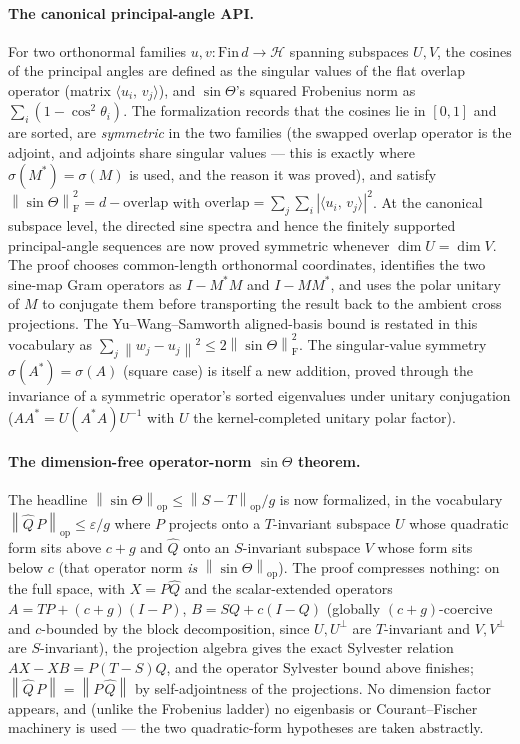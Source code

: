 \documentclass[11pt]{article}
\newcommand{\norm}[1]{\left\lVert #1\right\rVert}
\newcommand{\eps}{\varepsilon}
\newcommand{\F}{\mathrm{F}}
\newcommand{\op}{\mathrm{op}}
\newcommand{\inner}[2]{\langle #1,\,#2\rangle}
\newcommand{\gap}{g}
\newcommand{\HH}{\mathcal H}
\newcommand{\sinT}{\sin\Theta}
\theoremstyle{remark}
\begin{document}
\paragraph{The canonical principal-angle API.}
For two orthonormal families $u,v:\mathrm{Fin}\,d\to\HH$ spanning subspaces
$U,V$, the cosines of the principal angles are defined as the singular values
of the flat overlap operator (matrix $\inner{u_i}{v_j}$), and $\sin\Theta$'s
squared Frobenius norm as $\sum_i(1-\cos^2\theta_i)$.  The formalization records
that the cosines lie in $[0,1]$ and are sorted, are \emph{symmetric} in the two
families (the swapped overlap operator is the adjoint, and adjoints share
singular values --- this is exactly where $\sigma(M^{*})=\sigma(M)$ is used, and
the reason it was proved), and satisfy $\norm{\sinT}_{\F}^2=d-\mathrm{overlap}$
with $\mathrm{overlap}=\sum_j\sum_i|\inner{u_i}{v_j}|^2$.  At the canonical
subspace level, the directed sine spectra and hence the finitely supported
principal-angle sequences are now proved symmetric whenever
$\dim U=\dim V$.  The proof chooses common-length orthonormal coordinates,
identifies the two sine-map Gram operators as $I-M^{*}M$ and $I-MM^{*}$, and
uses the polar unitary of $M$ to conjugate them before transporting the result
back to the ambient cross projections.  The Yu--Wang--Samworth aligned-basis
bound is restated in this vocabulary as
$\sum_j\norm{w_j-u_j}^2\le2\norm{\sinT}_{\F}^2$.  The singular-value symmetry
$\sigma(A^{*})=\sigma(A)$ (square case) is itself a new addition, proved through
the invariance of a symmetric operator's sorted eigenvalues under unitary
conjugation ($AA^{*}=U(A^{*}A)U^{-1}$ with $U$ the kernel-completed unitary
polar factor).

\paragraph{The dimension-free operator-norm $\sin\Theta$ theorem.}
The headline $\norm{\sinT}_{\op}\le\norm{S-T}_{\op}/\gap$ is now formalized,
in the vocabulary $\norm{\widehat Q\,P}_{\op}\le\eps/\gap$ where $P$ projects
onto a $T$-invariant subspace $U$ whose quadratic form sits above $c+\gap$ and
$\widehat Q$ onto an $S$-invariant subspace $V$ whose form sits below $c$ (that
operator norm \emph{is} $\norm{\sinT}_{\op}$).  The proof compresses nothing:
on the full space, with $X=P\widehat Q$ and the scalar-extended operators
$A=TP+(c+\gap)(I-P)$, $B=SQ+c(I-Q)$ (globally $(c+\gap)$-coercive and
$c$-bounded by the block decomposition, since $U,U^{\perp}$ are $T$-invariant
and $V,V^{\perp}$ are $S$-invariant), the projection algebra gives the exact
Sylvester relation $AX-XB=P(T-S)Q$, and the operator Sylvester bound above
finishes; $\norm{\widehat Q\,P}=\norm{P\,\widehat Q}$ by self-adjointness of
the projections.  No dimension factor appears, and (unlike the Frobenius
ladder) no eigenbasis or Courant--Fischer machinery is used --- the two
quadratic-form hypotheses are taken abstractly.
\end{document}
